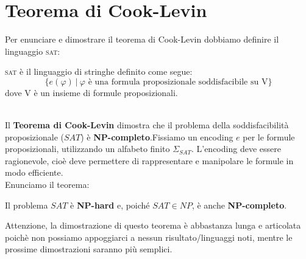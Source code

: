 \section{Teorema di Cook-Levin}
Per enunciare e dimostrare il teorema di Cook-Levin dobbiamo definire il linguaggio \textsc{sat}:\smallskip\\
\colorbox{SALZO}{\parbox{\dimexpr\linewidth-2\fboxsep}{\begin{definition}
    \textsc{sat} è il linguaggio di stringhe definito come segue:
    \[    \big\{    e(\varphi)  \ | \ \varphi \text{ è una formula proposizionale soddisfacibile su V}  \big\}      \]
    dove V è un insieme di formule proposizionali.
\end{definition}}}\smallskip\\
Il \textbf{Teorema di Cook-Levin} dimostra che il problema
della soddisfacibilità proposizionale ($SAT$) è
\textbf{NP-completo}.Fissiamo un encoding $e$ per le formule proposizionali,
utilizzando un alfabeto finito $\Sigma_{SAT}$.
L'encoding deve essere ragionevole, cioè deve permettere
di rappresentare e manipolare le formule in modo efficiente.\\
Enunciamo il teorema: \smallskip\\
\colorbox{SALZO}{\parbox{\dimexpr\linewidth-2\fboxsep}{
\begin{theorem}
Il problema $SAT$ è \textbf{NP-hard} e, poiché
$SAT\in NP$, è anche \textbf{NP-completo}.
\end{theorem}
}}
Attenzione, la dimostrazione di questo teorema è abbastanza lunga e articolata poichè non possiamo appoggiarci 
a nessun risultato/linguaggi noti, mentre le prossime dimostrazioni saranno più semplici. 
